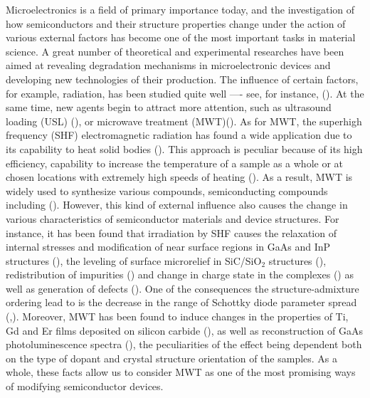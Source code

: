\documentclass[final,3p,times,twocolumn,authoryear]{elsarticle}
\begin{document}
Microelectronics is a field of primary importance today, and the investigation of how semiconductors and their structure properties change under the action of various external factors has become one of the most important tasks in material science.
A great number of theoretical and experimental researches have been aimed at revealing degradation mechanisms in microelectronic devices and developing new technologies of their production.
The influence of certain factors, for example, radiation, has been studied quite well ---- see, for instance, (\cite{KozlovsEn,RadiationEffectsBook,DefByIon}).
At the same time, new agents begin to attract more attention, such as ultrasound loading (USL)
(\cite{Olikh2018JAP,Olikh2006TPL}),
or microwave treatment (MWT)(\cite{MW:Rev,ZOHM2000,BHUNIA1998,Bacherikov2003En,Pashkov1994En,
BoltovetsEn,Milenin1994En,BelyaevIntac,ASHKINADZE1996,ProcSPIE,Belyaev1998JTFEn,
Bacherikov2008En,Konakova2015En,Konakova2012FTPEn}).
As for MWT, the superhigh frequency (SHF) electromagnetic radiation has found a wide application due to its capability to heat solid bodies  (\cite{MW:Rev,ZOHM2000}).
This approach is peculiar because of its high efficiency, capability to increase the temperature
of a sample as a whole or at chosen locations with extremely high speeds of heating (\cite{MW:Rev}).
As a result, MWT is widely used to synthesize various compounds, semiconducting compounds including (\cite{MW:Rev,BHUNIA1998}).
However, this kind of external influence also causes the change in various characteristics of semiconductor materials and device structures.
For instance, it has been found that irradiation by  SHF causes the relaxation of internal stresses and modification of near surface regions
in GaAs and InP structures (\cite{BoltovetsEn,Pashkov1994En,Milenin1994En,BelyaevIntac,ProcSPIE,Konakova2015En,Konakova2012FTPEn}),
the leveling of surface microrelief in SiC/SiO$_2$ structures (\cite{Bacherikov2003En}),
redistribution of impurities (\cite{Bacherikov2003En,Belyaev1998JTFEn,Konakova2015En})
and change in charge state in the complexes (\cite{Milenin1994En}) as well as generation of defects (\cite{Belyaev1998JTFEn}).
One of the consequences the structure-admixture ordering  lead to is the decrease in the range of
Schottky diode parameter spread (\cite{Milenin1994En},\cite{Belyaev1998JTFEn}).
Moreover, MWT has been found to induce changes in the properties of Ti, Gd and Er films deposited on silicon carbide (\cite{Bacherikov2008En}),
as well as reconstruction of GaAs photoluminescence spectra (\cite{BelyaevIntac,ProcSPIE,Belyaev1998JTFEn}),
the peculiarities of the effect being dependent both on the type of dopant and crystal structure orientation of the samples.
As a whole, these facts allow us to consider MWT as one of the most promising ways of modifying semiconductor devices.
\end{document}
